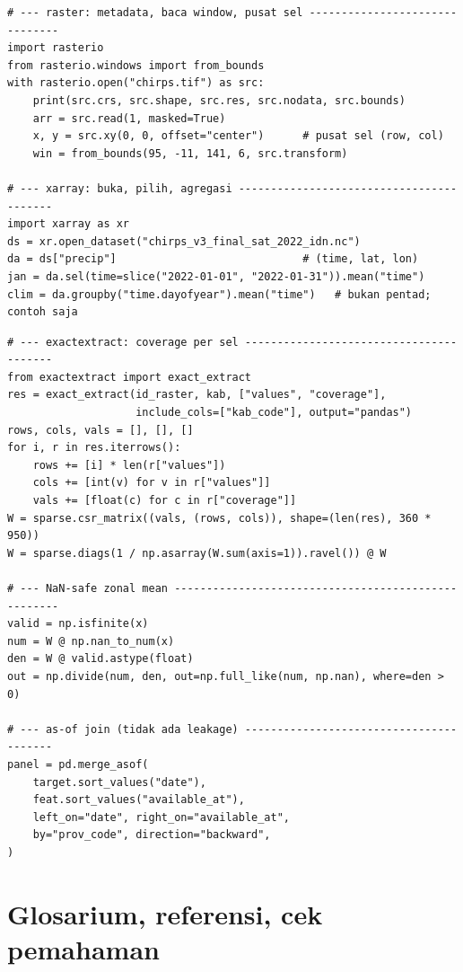 \documentclass[9pt,a4paper]{extarticle}
\begin{document}
\begin{lstlisting}
# --- raster: metadata, baca window, pusat sel -------------------------------
import rasterio
from rasterio.windows import from_bounds
with rasterio.open("chirps.tif") as src:
    print(src.crs, src.shape, src.res, src.nodata, src.bounds)
    arr = src.read(1, masked=True)
    x, y = src.xy(0, 0, offset="center")      # pusat sel (row, col)
    win = from_bounds(95, -11, 141, 6, src.transform)

# --- xarray: buka, pilih, agregasi -----------------------------------------
import xarray as xr
ds = xr.open_dataset("chirps_v3_final_sat_2022_idn.nc")
da = ds["precip"]                             # (time, lat, lon)
jan = da.sel(time=slice("2022-01-01", "2022-01-31")).mean("time")
clim = da.groupby("time.dayofyear").mean("time")   # bukan pentad; contoh saja
\end{lstlisting}

\begin{lstlisting}
# --- exactextract: coverage per sel ----------------------------------------
from exactextract import exact_extract
res = exact_extract(id_raster, kab, ["values", "coverage"],
                    include_cols=["kab_code"], output="pandas")
rows, cols, vals = [], [], []
for i, r in res.iterrows():
    rows += [i] * len(r["values"])
    cols += [int(v) for v in r["values"]]
    vals += [float(c) for c in r["coverage"]]
W = sparse.csr_matrix((vals, (rows, cols)), shape=(len(res), 360 * 950))
W = sparse.diags(1 / np.asarray(W.sum(axis=1)).ravel()) @ W

# --- NaN-safe zonal mean ----------------------------------------------------
valid = np.isfinite(x)
num = W @ np.nan_to_num(x)
den = W @ valid.astype(float)
out = np.divide(num, den, out=np.full_like(num, np.nan), where=den > 0)

# --- as-of join (tidak ada leakage) ----------------------------------------
panel = pd.merge_asof(
    target.sort_values("date"),
    feat.sort_values("available_at"),
    left_on="date", right_on="available_at",
    by="prov_code", direction="backward",
)
\end{lstlisting}

\section{Glosarium, referensi, cek pemahaman}
\end{document}
